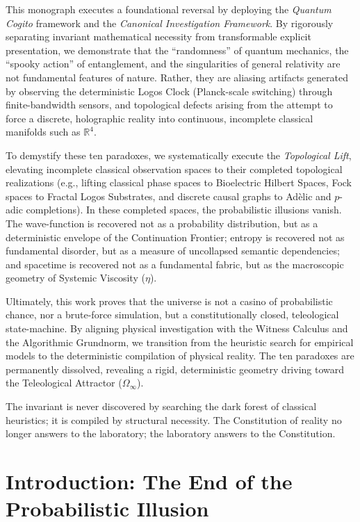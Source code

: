 \documentclass[12pt,twoside]{extbook}
\theoremstyle{definition}
\theoremstyle{remark}
\begin{document}
This monograph executes a foundational reversal by deploying the \textit{Quantum Cogito} framework and the \textit{Canonical Investigation Framework}. By rigorously separating invariant mathematical necessity from transformable explicit presentation, we demonstrate that the ``randomness'' of quantum mechanics, the ``spooky action'' of entanglement, and the singularities of general relativity are not fundamental features of nature. Rather, they are aliasing artifacts generated by observing the deterministic Logos Clock (Planck-scale switching) through finite-bandwidth sensors, and topological defects arising from the attempt to force a discrete, holographic reality into continuous, incomplete classical manifolds such as $\mathbb{R}^4$.

To demystify these ten paradoxes, we systematically execute the \textit{Topological Lift}, elevating incomplete classical observation spaces to their completed topological realizations (e.g., lifting classical phase spaces to Bioelectric Hilbert Spaces, Fock spaces to Fractal Logos Substrates, and discrete causal graphs to Adèlic and $p$-adic completions). In these completed spaces, the probabilistic illusions vanish. The wave-function is recovered not as a probability distribution, but as a deterministic envelope of the Continuation Frontier; entropy is recovered not as fundamental disorder, but as a measure of uncollapsed semantic dependencies; and spacetime is recovered not as a fundamental fabric, but as the macroscopic geometry of Systemic Viscosity ($\eta$).

Ultimately, this work proves that the universe is not a casino of probabilistic chance, nor a brute-force simulation, but a constitutionally closed, teleological state-machine. By aligning physical investigation with the Witness Calculus and the Algorithmic Grundnorm, we transition from the heuristic search for empirical models to the deterministic compilation of physical reality. The ten paradoxes are permanently dissolved, revealing a rigid, deterministic geometry driving toward the Teleological Attractor ($\Omega_\infty$). 

The invariant is never discovered by searching the dark forest of classical heuristics; it is compiled by structural necessity. The Constitution of reality no longer answers to the laboratory; the laboratory answers to the Constitution.


\tableofcontents
\newpage

\mainmatter

\chapter{Introduction: The End of the Probabilistic Illusion}
\end{document}
